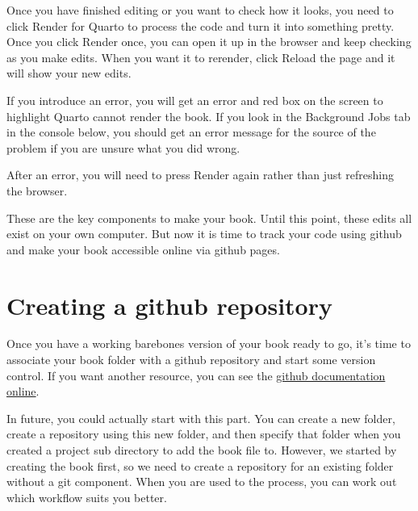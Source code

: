 \documentclass[
  letterpaper,
  DIV=11,
  numbers=noendperiod]{scrreprt}
\begin{document}
Once you have finished editing or you want to check how it looks, you
need to click Render for Quarto to process the code and turn it into
something pretty. Once you click Render once, you can open it up in the
browser and keep checking as you make edits. When you want it to
rerender, click Reload the page and it will show your new edits.

\begin{tcolorbox}[enhanced jigsaw, colbacktitle=quarto-callout-caution-color!10!white, titlerule=0mm, leftrule=.75mm, title=\textcolor{quarto-callout-caution-color}{\faFire}\hspace{0.5em}{Caution}, breakable, bottomrule=.15mm, opacitybacktitle=0.6, rightrule=.15mm, opacityback=0, arc=.35mm, colframe=quarto-callout-caution-color-frame, toptitle=1mm, bottomtitle=1mm, toprule=.15mm, left=2mm, colback=white, coltitle=black]

If you introduce an error, you will get an error and red box on the
screen to highlight Quarto cannot render the book. If you look in the
Background Jobs tab in the console below, you should get an error
message for the source of the problem if you are unsure what you did
wrong.

After an error, you will need to press Render again rather than just
refreshing the browser.

\end{tcolorbox}

These are the key components to make your book. Until this point, these
edits all exist on your own computer. But now it is time to track your
code using github and make your book accessible online via github pages.

\section{Creating a github
repository}\label{creating-a-github-repository}

Once you have a working barebones version of your book ready to go, it's
time to associate your book folder with a github repository and start
some version control. If you want another resource, you can see the
\href{https://docs.github.com/en/desktop/overview/creating-your-first-repository-using-github-desktop}{github
documentation online}.

In future, you could actually start with this part. You can create a new
folder, create a repository using this new folder, and then specify that
folder when you created a project sub directory to add the book file to.
However, we started by creating the book first, so we need to create a
repository for an existing folder without a git component. When you are
used to the process, you can work out which workflow suits you better.
\end{document}
